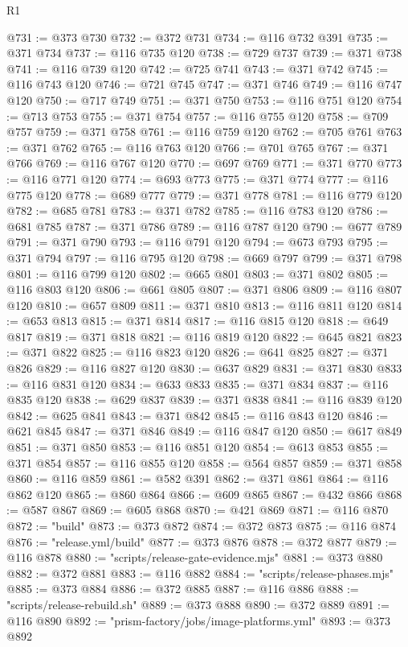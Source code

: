 \begin{lexlean}{R1}
\begin{coremodule}
@731 := @373 @730
@732 := @372 @731
@734 := @116 @732 @391
@735 := @371 @734
@737 := @116 @735 @120
@738 := @729 @737
@739 := @371 @738
@741 := @116 @739 @120
@742 := @725 @741
@743 := @371 @742
@745 := @116 @743 @120
@746 := @721 @745
@747 := @371 @746
@749 := @116 @747 @120
@750 := @717 @749
@751 := @371 @750
@753 := @116 @751 @120
@754 := @713 @753
@755 := @371 @754
@757 := @116 @755 @120
@758 := @709 @757
@759 := @371 @758
@761 := @116 @759 @120
@762 := @705 @761
@763 := @371 @762
@765 := @116 @763 @120
@766 := @701 @765
@767 := @371 @766
@769 := @116 @767 @120
@770 := @697 @769
@771 := @371 @770
@773 := @116 @771 @120
@774 := @693 @773
@775 := @371 @774
@777 := @116 @775 @120
@778 := @689 @777
@779 := @371 @778
@781 := @116 @779 @120
@782 := @685 @781
@783 := @371 @782
@785 := @116 @783 @120
@786 := @681 @785
@787 := @371 @786
@789 := @116 @787 @120
@790 := @677 @789
@791 := @371 @790
@793 := @116 @791 @120
@794 := @673 @793
@795 := @371 @794
@797 := @116 @795 @120
@798 := @669 @797
@799 := @371 @798
@801 := @116 @799 @120
@802 := @665 @801
@803 := @371 @802
@805 := @116 @803 @120
@806 := @661 @805
@807 := @371 @806
@809 := @116 @807 @120
@810 := @657 @809
@811 := @371 @810
@813 := @116 @811 @120
@814 := @653 @813
@815 := @371 @814
@817 := @116 @815 @120
@818 := @649 @817
@819 := @371 @818
@821 := @116 @819 @120
@822 := @645 @821
@823 := @371 @822
@825 := @116 @823 @120
@826 := @641 @825
@827 := @371 @826
@829 := @116 @827 @120
@830 := @637 @829
@831 := @371 @830
@833 := @116 @831 @120
@834 := @633 @833
@835 := @371 @834
@837 := @116 @835 @120
@838 := @629 @837
@839 := @371 @838
@841 := @116 @839 @120
@842 := @625 @841
@843 := @371 @842
@845 := @116 @843 @120
@846 := @621 @845
@847 := @371 @846
@849 := @116 @847 @120
@850 := @617 @849
@851 := @371 @850
@853 := @116 @851 @120
@854 := @613 @853
@855 := @371 @854
@857 := @116 @855 @120
@858 := @564 @857
@859 := @371 @858
@860 := @116 @859
@861 := @582 @391
@862 := @371 @861
@864 := @116 @862 @120
@865 := @860 @864
@866 := @609 @865
@867 := @432 @866
@868 := @587 @867
@869 := @605 @868
@870 := @421 @869
@871 := @116 @870
@872 := "build"
@873 := @373 @872
@874 := @372 @873
@875 := @116 @874
@876 := "release.yml/build"
@877 := @373 @876
@878 := @372 @877
@879 := @116 @878
@880 := "scripts/release-gate-evidence.mjs"
@881 := @373 @880
@882 := @372 @881
@883 := @116 @882
@884 := "scripts/release-phases.mjs"
@885 := @373 @884
@886 := @372 @885
@887 := @116 @886
@888 := "scripts/release-rebuild.sh"
@889 := @373 @888
@890 := @372 @889
@891 := @116 @890
@892 := "prism-factory/jobs/image-platforms.yml"
@893 := @373 @892

\end{coremodule}
\end{lexlean}
